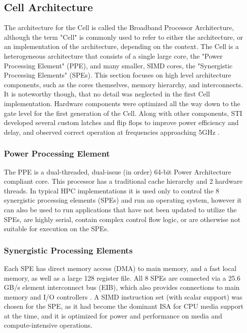 \documentclass{sig-alternate-05-2015}
\begin{document}
\subsection{Cell Architecture}

The architecture for the Cell is called the Broadband Processor Architecture, although the term "Cell" is commonly used to refer to either the architecture, or an implementation of the architecture, depending on the context. The Cell is a heterogeneous architecture that consists of a single large core, the "Power Processing Element" (PPE), and many smaller, SIMD cores, the "Synergistic Processing Elements" (SPEs). This section focuses on high level architecture components, such as the cores themselves, memory hierarchy, and interconnects. It is noteworthy though, that no detail was neglected in the first Cell implementation. Hardware components were optimized all the way down to the gate level for the first generation of the Cell. Along with other components, STI developed several custom latches and flip flops to improve power efficiency and delay, and observed correct operation at frequencies approaching 5GHz \cite{pham2005design}.

\subsubsection{Power Processing Element}

The PPE is a dual-threaded, dual-issue (in order) 64-bit Power Architecture compliant core. This processor has a traditional cache hierarchy and 2 hardware threads. In typical HPC implementations it is used only to control the 8 synergistic processing elements (SPEs) and run an operating system, however it can also be used to run applications that have not been updated to utilize the SPEs, are highly serial, contain complex control flow logic, or are otherwise not suitable for execution on the SPEs.

\subsubsection{Synergistic Processing Elements}

Each SPE has direct memory access (DMA) to main memory, and a fast local memory, as well as a large 128 register file. All 8 SPEs are connected via a 25.6 GB/s element interconnect bus (EIB), which also provides connections to main memory and I/O controllers \cite{kahle2005introduction}. A SIMD instruction set (with scalar support) was chosen for the SPE, as it had become the dominant ISA for CPU media support at the time, and it is optimized for power and performance on media and compute-intensive operations.
\end{document}
